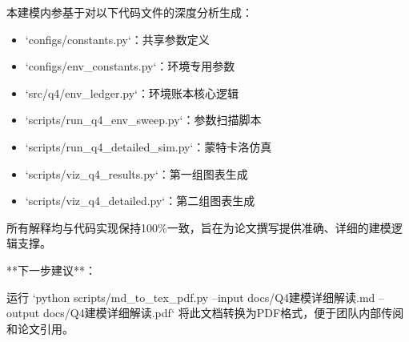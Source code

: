 \documentclass[a4paper,12pt]{article}
\begin{document}
\par
本建模内参基于对以下代码文件的深度分析生成：

\par
\begin{itemize}
\item `configs/constants.py`：共享参数定义
\end{itemize}
\begin{itemize}
\item `configs/env_constants.py`：环境专用参数
\end{itemize}
\begin{itemize}
\item `src/q4/env_ledger.py`：环境账本核心逻辑
\end{itemize}
\begin{itemize}
\item `scripts/run_q4_env_sweep.py`：参数扫描脚本
\end{itemize}
\begin{itemize}
\item `scripts/run_q4_detailed_sim.py`：蒙特卡洛仿真
\end{itemize}
\begin{itemize}
\item `scripts/viz_q4_results.py`：第一组图表生成
\end{itemize}
\begin{itemize}
\item `scripts/viz_q4_detailed.py`：第二组图表生成
\end{itemize}
所有解释均与代码实现保持100\%一致，旨在为论文撰写提供准确、详细的建模逻辑支撑。

\par
**下一步建议**：

\par
运行 `python scripts/md\_to\_tex\_pdf.py --input docs/Q4建模详细解读.md --output docs/Q4建模详细解读.pdf` 将此文档转换为PDF格式，便于团队内部传阅和论文引用。

\par
\end{document}
